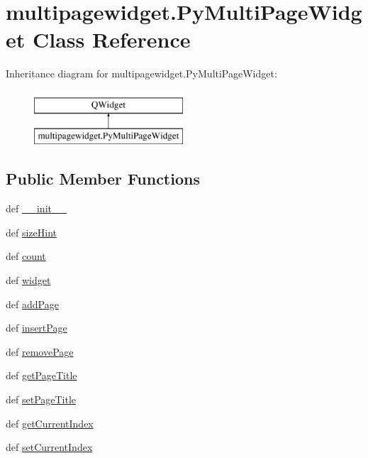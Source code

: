 \hypertarget{classmultipagewidget_1_1PyMultiPageWidget}{}\section{multipagewidget.\+Py\+Multi\+Page\+Widget Class Reference}
\label{classmultipagewidget_1_1PyMultiPageWidget}
Inheritance diagram for multipagewidget.\+Py\+Multi\+Page\+Widget\+:\begin{figure}[H]
\begin{center}
\leavevmode
\includegraphics[height=2.000000cm]{classmultipagewidget_1_1PyMultiPageWidget}
\end{center}
\end{figure}
\subsection*{Public Member Functions}
\begin{DoxyCompactItemize}
\item 
def \hyperlink{classmultipagewidget_1_1PyMultiPageWidget_a40d7d74245e7f21ddd92e05d6257c4be}{\+\_\+\+\_\+init\+\_\+\+\_\+}
\item 
def \hyperlink{classmultipagewidget_1_1PyMultiPageWidget_a4e04aa79efeb19ce153c342012b4404f}{size\+Hint}
\item 
def \hyperlink{classmultipagewidget_1_1PyMultiPageWidget_a7d77cea8d7383e5c2ef9aa75376738cb}{count}
\item 
def \hyperlink{classmultipagewidget_1_1PyMultiPageWidget_a94d9a05bdc19a639ce35e10bb2d83f66}{widget}
\item 
def \hyperlink{classmultipagewidget_1_1PyMultiPageWidget_a416f93862e11e1be0d7f876c0d8e9aab}{add\+Page}
\item 
def \hyperlink{classmultipagewidget_1_1PyMultiPageWidget_a3db2dba31ce5c251f2e8b5d1eece1348}{insert\+Page}
\item 
def \hyperlink{classmultipagewidget_1_1PyMultiPageWidget_a78c68168195697a4ee440c904b0ad475}{remove\+Page}
\item 
def \hyperlink{classmultipagewidget_1_1PyMultiPageWidget_a9fbecb04d0ed28f37c998339d56e99ab}{get\+Page\+Title}
\item 
def \hyperlink{classmultipagewidget_1_1PyMultiPageWidget_ae31194377f3226d2862368d7896a2ca1}{set\+Page\+Title}
\item 
def \hyperlink{classmultipagewidget_1_1PyMultiPageWidget_aac7bc792c5b8a91cf1a5e1564ed0f758}{get\+Current\+Index}
\item 
def \hyperlink{classmultipagewidget_1_1PyMultiPageWidget_a7eac1b9f4a5bbbaf9665b50407a12744}{set\+Current\+Index}
\end{DoxyCompactItemize}
